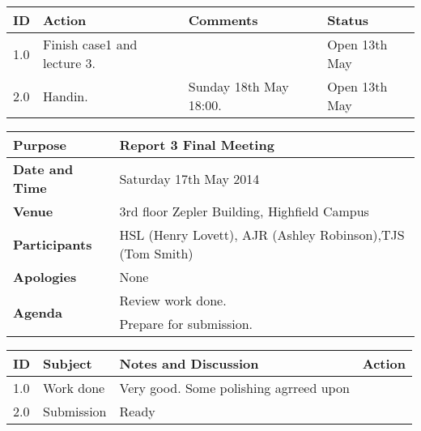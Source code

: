 \begin{center}
\begin{longtable}{| p{} | >{\raggedright\arraybackslash}p{} |  p{} | >{\raggedright\arraybackslash}p{}|} \hline
\textbf{ID} & \textbf{Action} & \textbf{Comments} & \textbf{Status} \\ \hline
\endhead
1.0	&	Finish case1 and lecture 3.	&	& Open 13th May \\ \hline
2.0	&	Handin.	&Sunday 18th May 18:00.	&	Open 13th May \\ \hline
\end{longtable}
\end{center}







\begin{center}
\begin{longtable}{| m{} | m{} |} \hline
\textbf{Purpose} & Report 3 Final Meeting \\ \hline
\textbf{Date and Time} & Saturday 17th May 2014 \\ \hline
\textbf{Venue} & 3rd floor Zepler Building, Highfield Campus \\ \hline
\textbf{Participants} & HSL (Henry Lovett), AJR (Ashley Robinson),TJS (Tom Smith)\\ \hline
\textbf{Apologies} & None \\ \hline
\multirow{3}{*}{\textbf{Agenda}} & Review work done. \\ 
  & Prepare for submission. \\ \hline
\end{longtable}
\end{center}

\begin{center}
\begin{longtable}{| p{} |>{\raggedright\arraybackslash}p{} | p{} |>{\raggedright\arraybackslash}p{}|} \hline
\textbf{ID} & \textbf{Subject} & \textbf{Notes and Discussion} & \textbf{Action} \\ \hline
\endhead
1.0	&	Work done	&	Very good. Some polishing agrreed upon &   \\ \hline
2.0 & Submission  & Ready &  \\ \hline

\end{longtable}
\end{center}

